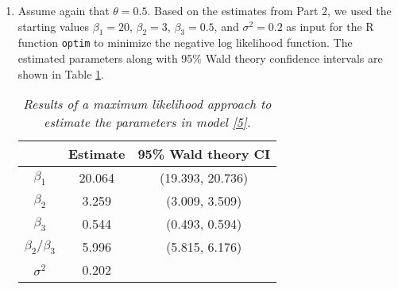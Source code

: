 \documentclass[12pt]{article}
\begin{document}
\begin{enumerate}
    \newpage
  \item Assume again that $\theta = 0.5$. Based on the estimates from Part 2, we used the starting values $\beta_1 = 20$, $\beta_2 = 3$, $\beta_3 =
    0.5$, and $\sigma^{2} = 0.2$ as input for the R function \texttt{optim} to minimize the negative log likelihood function.  The estimated
    parameters along with 95\% Wald theory confidence intervals are shown in Table \ref{tab3.1}.

    \begin{table}[h]
      \caption{\emph{Results of a maximum likelihood approach to estimate the parameters in model \eqref{5}.}}
      \vspace{.2cm}
      \centering
      \begin{tabular}{|c|c|c|}
        \hline
        & Estimate & 95\% Wald theory CI \\
        \hline
        $\beta_1$ & 20.064 & (19.393, 20.736) \\
        \hline
        $\beta_2$ & 3.259 & (3.009, 3.509) \\
        \hline
        $\beta_3$ & 0.544 & (0.493, 0.594) \\
        \hline
        $\beta_2 / \beta_3$ & 5.996 & (5.815, 6.176) \\
        \hline
        $\sigma^{2}$ & 0.202 & \\
        \hline
      \end{tabular}
      \label{tab3.1}
    \end{table}



\end{enumerate}
\end{document}
